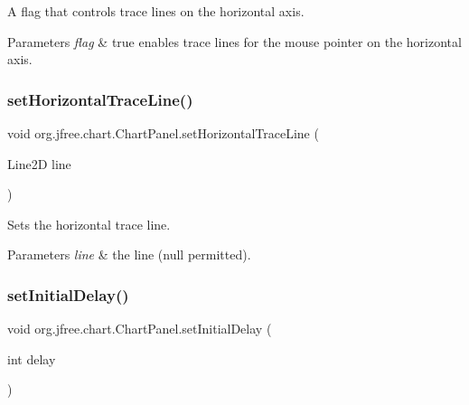 A flag that controls trace lines on the horizontal axis.


\begin{DoxyParams}{Parameters}
{\em flag} & {\ttfamily true} enables trace lines for the mouse pointer on the horizontal axis. \\
\hline
\end{DoxyParams}
\mbox{\label{classorg_1_1jfree_1_1chart_1_1_chart_panel_af05196ce8bb83ce1a86bfb5043994454}} 
\subsubsection{\texorpdfstring{set\+Horizontal\+Trace\+Line()}{setHorizontalTraceLine()}}
{\footnotesize\ttfamily void org.\+jfree.\+chart.\+Chart\+Panel.\+set\+Horizontal\+Trace\+Line (\begin{DoxyParamCaption}\item[{Line2D}]{line }\end{DoxyParamCaption})\hspace{0.3cm}{\ttfamily [protected]}}

Sets the horizontal trace line.


\begin{DoxyParams}{Parameters}
{\em line} & the line ({\ttfamily null} permitted). \\
\hline
\end{DoxyParams}
\mbox{\label{classorg_1_1jfree_1_1chart_1_1_chart_panel_a42b50d91afaf348313f2a508956195db}} 
\subsubsection{\texorpdfstring{set\+Initial\+Delay()}{setInitialDelay()}}
{\footnotesize\ttfamily void org.\+jfree.\+chart.\+Chart\+Panel.\+set\+Initial\+Delay (\begin{DoxyParamCaption}\item[{int}]{delay }\end{DoxyParamCaption})}

